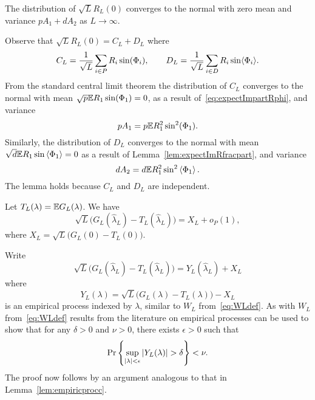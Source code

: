 \documentclass[journal]{IEEEtran}
\begin{document}
\begin{lemma}\label{lem:convdistGLdash}
The distribution of $\sqrt{L}R_L(0)$ converges to the normal with zero mean and variance $pA_1 + dA_2$ as $L\rightarrow\infty$.
\end{lemma}
\begin{IEEEproof}
Observe that $\sqrt{L} R_L(0) = C_L + D_L$ where
\[
C_L = \frac{1}{\sqrt{L}} \sum_{i \in P} R_i \sin(\Phi_i), \qquad D_L = \frac{1}{\sqrt{L}} \sum_{i \in D} R_i \sin\langle \Phi_i \rangle.
\]
From the standard central limit theorem the distribution of $C_L$ converges to the normal with mean $\sqrt{p}{\mathbb E} R_1 \sin(\Phi_1) = 0$, as a result of~\eqref{eq:expectImpartRphi}, and variance
\[
p A_1 = p {\mathbb E} R_1^2 \sin^2(\Phi_1).
\]
Similarly, the distribution of $D_L$ converges to the normal with mean $\sqrt{d}{\mathbb E} R_1 \sin\left\langle \Phi_1 \right\rangle = 0$ as a result of Lemma~\ref{lem:expectImRfracpart}, and variance
\[
d A_2 = d {\mathbb E} R_1^2 \sin^2\left\langle \Phi_1 \right\rangle.
\]
The lemma holds because $C_L$ and $D_L$ are independent. 
\end{IEEEproof}

\begin{lemma}\label{lem:empiricprocforrho} Let $T_L(\lambda) = {\mathbb E} G_L(\lambda)$.  We have
\[
\sqrt{L}\big( G_L(\hat{\lambda}_L) - T_L(\hat{\lambda}_L) \big) =  X_L + o_P(1),
\]
where $X_L = \sqrt{L} \big( G_L(0) - T_L(0) \big)$.
\end{lemma}
\begin{IEEEproof}
Write
\[
\sqrt{L}\big( G_L(\hat{\lambda}_L) - T_L(\hat{\lambda}_L) \big) = Y_L(\hat{\lambda}_L) + X_L
\]
where
\begin{equation}\label{eq:YLdef}
Y_L(\lambda) = \sqrt{L}\big( G_L(\lambda) - T_L(\lambda) \big) - X_L
\end{equation}
is an empirical process indexed by $\lambda$, similar to $W_L$ from~\eqref{eq:WLdef}.  As with $W_L$ from~\eqref{eq:WLdef} results from the literature on empirical processes can be used to show that  
for any $\delta > 0$ and $\nu > 0$, there exists $\epsilon > 0$ such that
\[
\Pr\left\{ \sup_{{\vert \lambda \vert}<\epsilon}{\vert Y_L(\lambda) \vert} > \delta  \right\} < \nu.
\]
The proof now follows by an argument analogous to that in Lemma~\ref{lem:empiricprocc}.
\end{IEEEproof}
\end{document}

